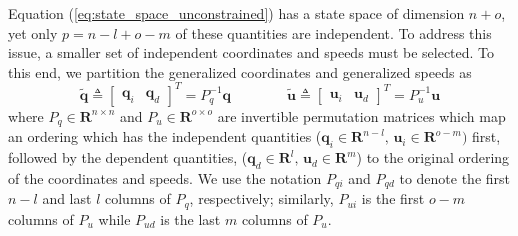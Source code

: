 \documentclass[smallcondensed,final]{svjour3}                     %
\begin{document}
Equation (\ref{eq:state_space_unconstrained}) has a state space of dimension $n
+ o$, yet only $p = n - l + o - m$ of these quantities are independent.  To
address this issue, a smaller set of independent coordinates and speeds must be
selected. To this end, we partition the generalized coordinates and generalized
speeds as
\begin{equation*}
  \tilde{\bm{q}} \triangleq \left[\begin{array}{cc}\bm{q}_{i} &
      \bm{q}_{d}\end{array}\right]^{T} =  P_{q}^{-1} \bm{q}
      \qquad\qquad
  \tilde{\bm{u}} \triangleq \left[\begin{array}{cc}\bm{u}_{i} &
      \bm{u}_{d}\end{array}\right]^{T} =  P_{u}^{-1} \bm{u}
\end{equation*}
where $P_q \in \mathbf{R}^{n \times n}$ and $P_u \in \mathbf{R}^{o \times o}$
are invertible permutation matrices which map an ordering which has the
independent quantities ($\bm{q}_{i}\in\mathbf{R}^{n-l},\,
\bm{u}_{i}\in\mathbf{R}^{o-m})$ first, followed by the dependent quantities,
($\bm{q}_{d}\in\mathbf{R}^{l},\, \bm{u}_{d}\in\mathbf{R}^{m}$) to the original
ordering of the coordinates and speeds.  We use the notation $P_{qi}$ and
$P_{qd}$ to denote the first $n-l$ and last $l$ columns of $P_q$, respectively;
similarly, $P_{ui}$ is the first $o-m$ columns of $P_{u}$ while $P_{ud}$ is the
last $m$ columns of $P_u$.
\end{document}
